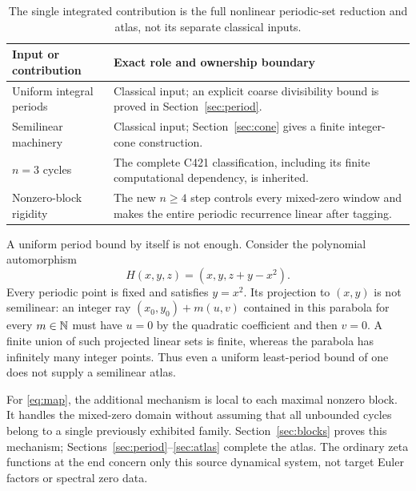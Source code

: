 \begin{table}[ht]
\centering\small
\begin{tabular}{@{}p{}p{}@{}}
\toprule
Input or contribution & Exact role and ownership boundary\\
\midrule
Uniform integral periods & Classical input; an explicit coarse
divisibility bound is proved in Section~\ref{sec:period}.\\
Semilinear machinery & Classical input; Section~\ref{sec:cone} gives
a finite integer-cone construction.\\
$n=3$ cycles & The complete C421 classification,
including its finite computational dependency, is inherited.\\
Nonzero-block rigidity & The new $n\ge4$ step controls every mixed-zero
window and makes the entire periodic recurrence linear after tagging.\\
\bottomrule
\end{tabular}
\caption{The single integrated contribution is the full nonlinear
periodic-set reduction and atlas, not its separate classical inputs.}
\label{tab:ownership}
\end{table}

A uniform period bound by itself is not enough. Consider the
polynomial automorphism
\[
 H(x,y,z)=(x,y,z+y-x^2).
\]
Every periodic point is fixed and satisfies $y=x^2$. Its projection
to $(x,y)$ is not semilinear:
an integer ray $(x_0,y_0)+m(u,v)$ contained in this parabola for every
$m\in\mathbb N$ must have $u=0$ by the quadratic coefficient and then $v=0$.
A finite union of such projected linear sets is finite, whereas the
parabola has infinitely many integer points. Thus even a uniform
least-period bound of one does not supply a semilinear atlas.

For \eqref{eq:map}, the additional mechanism is local to each maximal
nonzero block. It handles the mixed-zero domain without assuming that
all unbounded cycles belong to a single previously exhibited family.
Section~\ref{sec:blocks} proves this mechanism;
Sections~\ref{sec:period}--\ref{sec:atlas} complete the atlas.
The ordinary zeta functions at the end concern only this source
dynamical system, not target Euler factors or spectral zero data.
